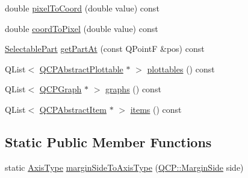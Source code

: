 \begin{DoxyCompactItemize}
double \hyperlink{class_q_c_p_axis_ae9289ef7043b9d966af88eaa95b037d1}{pixel\-To\-Coord} (double value) const 
\item 
double \hyperlink{class_q_c_p_axis_a985ae693b842fb0422b4390fe36d299a}{coord\-To\-Pixel} (double value) const 
\item 
\hyperlink{class_q_c_p_axis_abee4c7a54c468b1385dfce2c898b115f}{Selectable\-Part} \hyperlink{class_q_c_p_axis_ab2965a8ab1da948b897f1c006080760b}{get\-Part\-At} (const Q\-Point\-F \&pos) const 
\item 
Q\-List$<$ \hyperlink{class_q_c_p_abstract_plottable}{Q\-C\-P\-Abstract\-Plottable} $\ast$ $>$ \hyperlink{class_q_c_p_axis_a4f7404494cccdbfc00e1e865b7ed16a4}{plottables} () const 
\item 
Q\-List$<$ \hyperlink{class_q_c_p_graph}{Q\-C\-P\-Graph} $\ast$ $>$ \hyperlink{class_q_c_p_axis_ad3919e7d7400f55446ea82018fe5e3a8}{graphs} () const 
\item 
Q\-List$<$ \hyperlink{class_q_c_p_abstract_item}{Q\-C\-P\-Abstract\-Item} $\ast$ $>$ \hyperlink{class_q_c_p_axis_ae437656a5fd1a03721a8f2d7aab460fe}{items} () const 
\end{DoxyCompactItemize}
\subsection*{Static Public Member Functions}
\begin{DoxyCompactItemize}
\item 
static \hyperlink{class_q_c_p_axis_ae2bcc1728b382f10f064612b368bc18a}{Axis\-Type} \hyperlink{class_q_c_p_axis_ac0a6b77bd52bec6c81cd62d167cfeba6}{margin\-Side\-To\-Axis\-Type} (\hyperlink{namespace_q_c_p_a7e487e3e2ccb62ab7771065bab7cae54}{Q\-C\-P\-::\-Margin\-Side} side)
\end{DoxyCompactItemize}
